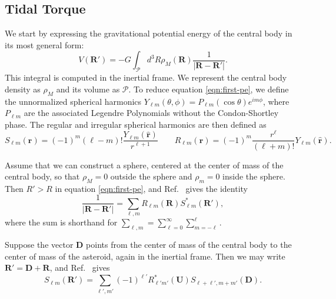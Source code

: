 \documentclass[11pt]{article}
\newcommand{\unit}[1]{\hat{\mathbf{#1}}}
\begin{document}
\subsection{Tidal Torque}
We start by expressing the gravitational potential energy of the central body in its most general form:
\begin{equation}
V(\bm R') = -G\int_\mathcal{P} d^3 R \rho_M(\bm R) \frac{1}{|\bm{R}-\bm{R'}|}.
\label{eqn:first-pe}
\end{equation}
This integral is computed in the inertial frame. We represent the central body density as $\rho_M$ and its volume as $\mathcal{P}$. To reduce equation \ref{eqn:first-pe}, we define the unnormalized spherical harmonics $Y_{\ell m}(\theta, \phi) = P_{\ell m}(\cos \theta)e^{im\phi}$, where $P_{\ell m}$ are the associated Legendre Polynomials without the Condon-Shortley phase. The regular and irregular spherical harmonics are then defined as
\begin{equation}
S_{\ell m}(\bm r) = (-1)^m (\ell - m)! \frac{Y_{\ell m}(\unit r)}{r^{\ell+1}} \qquad R_{\ell m} (\bm r) = (-1)^m \frac{r^\ell}{(\ell + m)!} Y_{\ell m}(\unit r).
\end{equation}

Assume that we can construct a sphere, centered at the center of mass of the central body, so that $\rho_M = 0$ outside the sphere and $\rho_m = 0$ inside the sphere. Then $R' > R$ in equation \ref{eqn:first-pe}, and Ref.~\cite{Gelderen1998TheSO} gives the identity
\begin{equation}
\frac{1}{|\bm R - \bm R'|} = \sum_{\ell, m} R_{\ell m}(\bm R) S_{\ell m}^*(\bm R'),
\label{eqn:1-over-r-expansion}
\end{equation}
where the sum is shorthand for $\sum_{\ell, m} = \sum_{\ell = 0}^\infty \sum_{m=-\ell}^\ell$.

Suppose the vector $\bm{D}$ points from the center of mass of the central body to the center of mass of the asteroid, again in the inertial frame. Then we may write $ \bm R' = \bm D + \bm R$, and Ref.~\cite{Gelderen1998TheSO} gives
\begin{equation}
S_{\ell m}(\bm R') = \sum_{\ell', m'} (-1)^{\ell'}R^*_{\ell' m'}(\bm U)S_{\ell+\ell', m + m'} (\bm D).
\end{equation}
\end{document}
